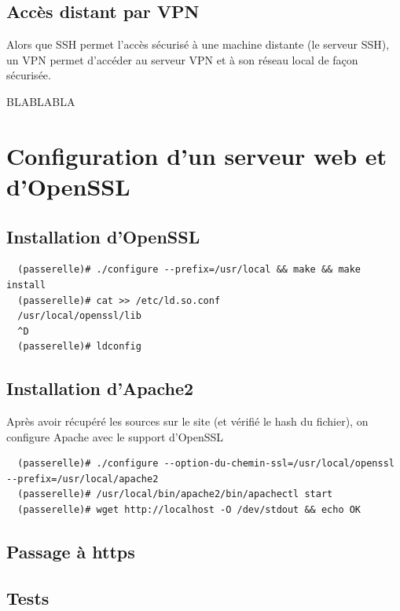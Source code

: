\documentclass[a4paper]{article}
\begin{document}
\subsection{Accès distant par VPN}

Alors que SSH permet l'accès sécurisé à une machine distante (le serveur SSH),
un VPN permet d'accéder au serveur VPN et à son réseau local de façon sécurisée.

BLABLABLA

\section{Configuration d'un serveur web et d'OpenSSL}
\subsection{Installation d'OpenSSL}
\begin{verbatim}
  (passerelle)# ./configure --prefix=/usr/local && make && make install
  (passerelle)# cat >> /etc/ld.so.conf
  /usr/local/openssl/lib
  ^D
  (passerelle)# ldconfig
\end{verbatim}

\subsection{Installation d'Apache2}
Après avoir récupéré les sources sur le site (et vérifié le hash du fichier), on configure
Apache avec le support d'OpenSSL
\begin{verbatim}
  (passerelle)# ./configure --option-du-chemin-ssl=/usr/local/openssl --prefix=/usr/local/apache2
  (passerelle)# /usr/local/bin/apache2/bin/apachectl start
  (passerelle)# wget http://localhost -O /dev/stdout && echo OK
\end{verbatim}

\subsection{Passage à https}

\subsection{Tests}
\end{document}
